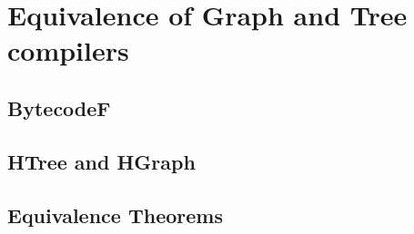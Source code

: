 \section{Equivalence of Graph and Tree compilers}

    \subsection{BytecodeF}


    \subsection{HTree and HGraph}


    \subsection{Equivalence Theorems}

